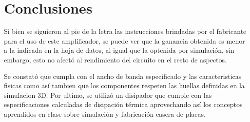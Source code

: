 \section{Conclusiones}

Si bien se siguieron al pie de la letra las instrucciones brindadas por el fabricante para el uso de este amplificador, se puede ver que la ganancia obtenida es menor a la indicada en la hoja de datos, al igual que la optenida por simulación, sin embargo, esto no afectó al rendimiento del circuito en el resto de aspectos.

Se constató que cumpla con el ancho de banda especificado y las caracteristicas fisicas como así tambien que los componentes respeten las huellas definidas en la simulacion 3D. Por ultimo, se utilizó un disipador que cumple con las especificaciones calculadas de disipación térmica aprovechando así los conceptos aprendidos en clase sobre simulación y fabricación casera de placas.